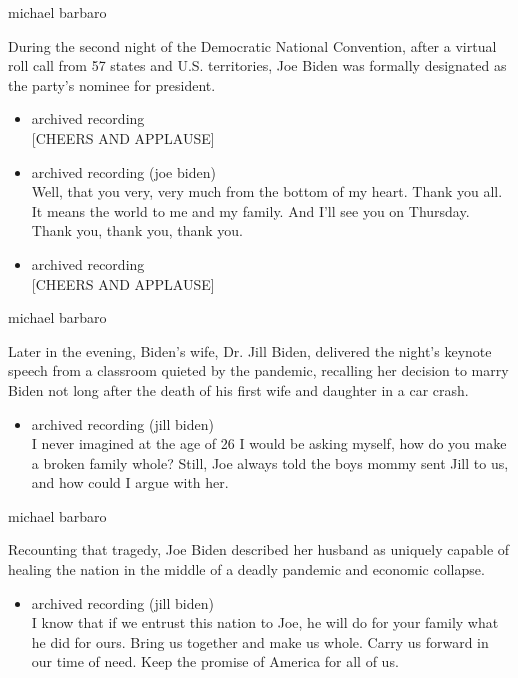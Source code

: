 michael barbaro

During the second night of the Democratic National Convention, after a
virtual roll call from 57 states and U.S. territories, Joe Biden was
formally designated as the party's nominee for president.

\begin{itemize}
\item
  archived recording\\
  {[}CHEERS AND APPLAUSE{]}
\item
  archived recording (joe biden)\\
  Well, that you very, very much from the bottom of my heart. Thank you
  all. It means the world to me and my family. And I'll see you on
  Thursday. Thank you, thank you, thank you.
\item
  archived recording\\
  {[}CHEERS AND APPLAUSE{]}
\end{itemize}

michael barbaro

Later in the evening, Biden's wife, Dr. Jill Biden, delivered the
night's keynote speech from a classroom quieted by the pandemic,
recalling her decision to marry Biden not long after the death of his
first wife and daughter in a car crash.

\begin{itemize}
\tightlist
\item
  archived recording (jill biden)\\
  I never imagined at the age of 26 I would be asking myself, how do you
  make a broken family whole? Still, Joe always told the boys mommy sent
  Jill to us, and how could I argue with her.
\end{itemize}

michael barbaro

Recounting that tragedy, Joe Biden described her husband as uniquely
capable of healing the nation in the middle of a deadly pandemic and
economic collapse.

\begin{itemize}
\tightlist
\item
  archived recording (jill biden)\\
  I know that if we entrust this nation to Joe, he will do for your
  family what he did for ours. Bring us together and make us whole.
  Carry us forward in our time of need. Keep the promise of America for
  all of us.
\end{itemize}

